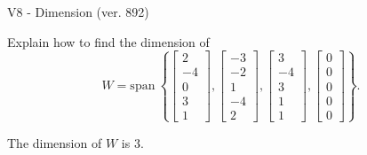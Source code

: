 \begin{exercise}
  \begin{exerciseTitle}V8 - Dimension (ver. 892)\end{exerciseTitle}
  \begin{exerciseStatement}
    Explain how to find the dimension of 
\[W=\mathrm{span}\ \left\{\left[\begin{array}{r}
2 \\
-4 \\
0 \\
3 \\
1
\end{array}\right] , \left[\begin{array}{r}
-3 \\
-2 \\
1 \\
-4 \\
2
\end{array}\right] , \left[\begin{array}{r}
3 \\
-4 \\
3 \\
1 \\
1
\end{array}\right] , \left[\begin{array}{r}
0 \\
0 \\
0 \\
0 \\
0
\end{array}\right]\right\}.\]



  \end{exerciseStatement}
  \begin{exerciseAnswer}
   The dimension of \(W\) is  \(3\).
  


  \end{exerciseAnswer}
\end{exercise}